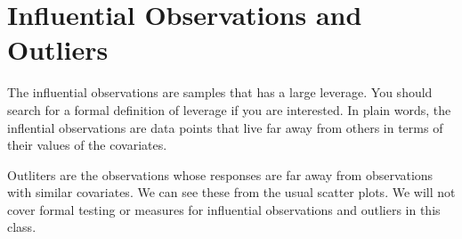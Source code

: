\documentclass[12pt,]{book}
\newenvironment{Shaded}{\begin{snugshade}}{\end{snugshade}}
\newcommand{\KeywordTok}[1]{\textcolor[rgb]{0.13,0.29,0.53}{\textbf{#1}}}
\newcommand{\DataTypeTok}[1]{\textcolor[rgb]{0.13,0.29,0.53}{#1}}
\newcommand{\DecValTok}[1]{\textcolor[rgb]{0.00,0.00,0.81}{#1}}
\newcommand{\StringTok}[1]{\textcolor[rgb]{0.31,0.60,0.02}{#1}}
\newcommand{\OperatorTok}[1]{\textcolor[rgb]{0.81,0.36,0.00}{\textbf{#1}}}
\newcommand{\NormalTok}[1]{#1}
\begin{document}
\begin{Shaded}
\end{Shaded}

\begin{Shaded}
\end{Shaded}

\section{Influential Observations and
Outliers}\label{influential-observations-and-outliers}

The influential observations are samples that has a large leverage. You
should search for a formal definition of leverage if you are interested.
In plain words, the inflential observations are data points that live
far away from others in terms of their values of the covariates.

Outliters are the observations whose responses are far away from
observations with similar covariates. We can see these from the usual
scatter plots. We will not cover formal testing or measures for
influential observations and outliers in this class.
\end{document}
